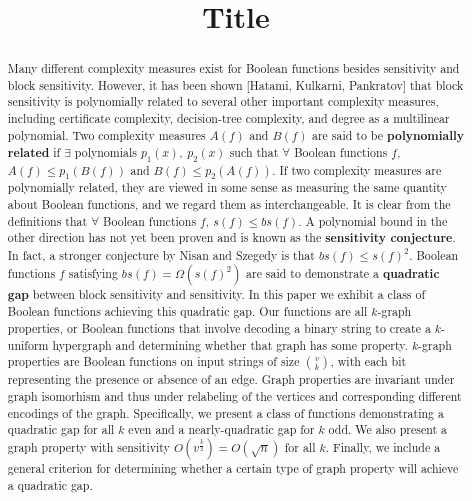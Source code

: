 \documentclass[psamsfonts]{amsart}
\theoremstyle{definition}
\theoremstyle{remark}
\numberwithin{equation}{section}
\begin{document}
	\title{Title}
	
	\begin{abstract}
		
		Many different complexity measures exist for Boolean functions besides sensitivity and block sensitivity.  However, it has been shown [Hatami, Kulkarni, Pankratov] that block sensitivity 
is polynomially related to several other important complexity measures, including certificate complexity, decision-tree complexity, and degree as a multilinear polynomial.  
Two complexity measures $A(f)$ and $B(f)$ are said to be \textbf{polynomially related} if $\exists$ polynomials $ p_{1}(x),  \: p_{2}(x) $ such that $\forall$ Boolean functions $f$, 
$A(f) \leq p_{1}(B(f))$ and $B(f) \leq p_{2}(A(f))$.  
If two complexity measures are polynomially related, they are viewed in some sense as measuring the same quantity about Boolean functions, and we regard them as interchangeable.  
It is clear from the definitions that $\forall$ Boolean functions $f$, $s(f) \leq bs(f)$.  A polynomial bound in the other direction has not yet been proven and is known as the 
\textbf{sensitivity conjecture}.  In fact, a stronger conjecture by Nisan and Szegedy is that $bs(f) \leq s(f)^{2}$.  Boolean functions $f$ satisfying $bs(f) = \Omega(s(f)^{2})$ are said to 
demonstrate a \textbf{quadratic gap} between block sensitivity and sensitivity.  In this paper we exhibit a class of Boolean functions achieving this 
quadratic gap.  Our functions are all $k$-graph properties, or Boolean functions that involve decoding a binary string to create a 
$k$-uniform hypergraph
and determining whether that graph has some property.  $k$-graph properties are Boolean functions on input strings of size ${v \choose k}$, with each bit representing the presence or 
absence of an edge.  Graph properties are invariant under graph isomorhism and thus under relabeling of the vertices and corresponding different encodings of the graph.  Specifically, we present a class of functions demonstrating a quadratic gap for all $k$ even and a nearly-quadratic gap for $k$ odd.  We also present a graph property with 
sensitivity $O(v^{\frac{k}{2}})=O(\sqrt n)$ for all $k$.  
Finally, we include a general criterion for determining whether a certain type of graph property will achieve a quadratic gap.  

	\end{abstract}
	
	\maketitle
	
\end{document}
